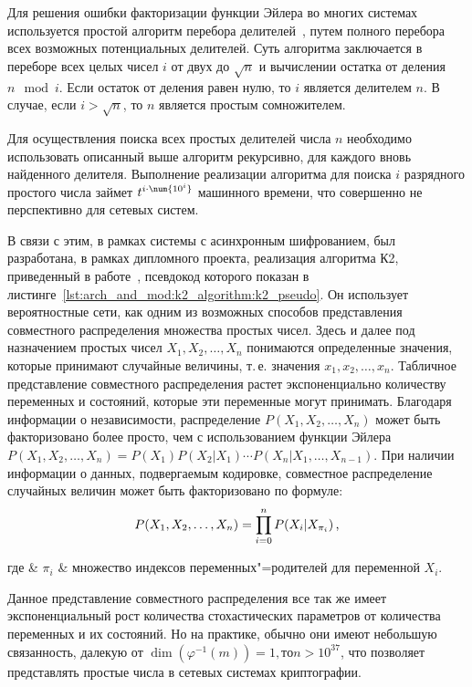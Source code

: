 Для решения ошибки факторизации функции Эйлера во многих системах используется простой алгоритм перебора делителей~\cite{algo_differ}, путем полного перебора всех возможных потенциальных делителей. Суть алгоритма заключается в переборе всех целых чисел $ i $ от двух до $ \sqrt{n} $ и вычислении остатка от деления $ n \mod i $. Если остаток от деления равен нулю, то $i$ является делителем $n$. В случае, если $i > \sqrt{n}$, то $n$ является простым сомножителем.

Для осуществления поиска всех простых делителей числа $n$ необходимо использовать описанный выше алгоритм рекурсивно, для каждого вновь найденного делителя. Выполнение реализации алгоритма для поиска $i$ разрядного простого числа займет $t^{i\cdot \num{10^{i}}}$ машинного времени, что совершенно не перспективно для сетевых систем.

В связи с этим, в рамках системы с асинхронным шифрованием, был разработана, в рамках дипломного проекта, реализация алгоритма К2, приведенный в работе~\cite{Cooper1991}, псевдокод которого показан в листинге~\ref{lst:arch_and_mod:k2_algorithm:k2_pseudo}.
Он использует вероятностные сети, как одним из возможных способов представления совместного распределения множества простых чисел.
Здесь и далее под назначением простых чисел $ X_1, X_2, \dotsc, X_n $ понимаются определенные значения, которые принимают случайные величины, т.\,е. значения $ x_1, x_2, \dotsc, x_n $.
Табличное представление совместного распределения растет экспоненциально количеству переменных и состояний, которые эти переменные могут принимать.
Благодаря информации о независимости, распределение $ P(X_1, X_2,\dotsc, X_n) $ может быть факторизовано более просто, чем с использованием функции Эйлера $ P(X_1, X_2,\dotsc, X_n) = P(X_1) P(X_2|X_1) \dotsm P(X_n|X_1,\dotsc,X_{n-1}) $.
При наличии информации о данных, подвергаемым кодировке, совместное распределение случайных величин может быть факторизовано по формуле:
\begin{equation}
  \label{eq:domain:bayes_net:joint_disitr}
  P(X_1, X_2,\dotsc, X_n) = \prod_{i = 0}^{n}{P(X_i|X_{\pi_i})} \text{\,,}
\end{equation}
\begin{explanation}
где & $ \pi_i $ & множество индексов переменных"=родителей для переменной $X_i$.
\end{explanation}

Данное представление совместного распределения все так же имеет экспоненциальный рост количества стохастических параметров от количества переменных и их состояний.
Но на практике, обычно они имеют небольшую связанность, далекую от $ \dim(\varphi^{-1}(m)) = 1, то n > 10^{37} $, что позволяет представлять простые числа в сетевых системах криптографии.

